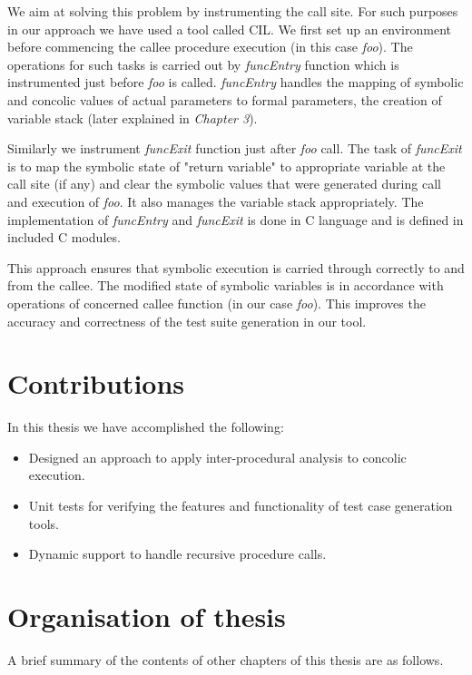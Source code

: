 \documentclass[12pt,oneside]{book}
\begin{document}
We aim at solving this problem by instrumenting the call site. For such purposes in our approach we have used a tool called CIL. We first set up an environment before commencing the callee procedure execution (in this case \textit{foo}). The operations for such tasks is carried out by \textit{funcEntry} function which is instrumented just before \textit{foo} is called. \textit{funcEntry} handles the mapping of symbolic and concolic values of actual parameters to formal parameters, the creation of variable stack (later explained in \textit{Chapter 3}).

Similarly we instrument \textit{funcExit} function just after \textit{foo} call. The task of \textit{funcExit} is to map the symbolic state of "return variable" to appropriate variable at the call site (if any) and clear the symbolic values that were generated during call and execution of \textit{foo}. It also manages the variable stack appropriately. The implementation of \textit{funcEntry} and \textit{funcExit} is done in C language and is defined in included C modules.

This approach ensures that symbolic execution is carried through correctly to and from the callee. The modified state of symbolic variables is in accordance with operations of concerned callee function (in our case \textit{foo}). This improves the accuracy and correctness of the test suite generation in our tool.  


\section {Contributions}
In this thesis we have accomplished the following:
\begin{itemize}
  \item Designed an approach to apply inter-procedural analysis to concolic execution. 
  \item Unit tests for verifying the features and functionality of test case generation tools. 
  \item Dynamic support to handle recursive procedure calls. 
\end{itemize}


\section {Organisation of thesis}
A brief summary of the contents of other chapters of this thesis are as follows.\\
\end{document}
